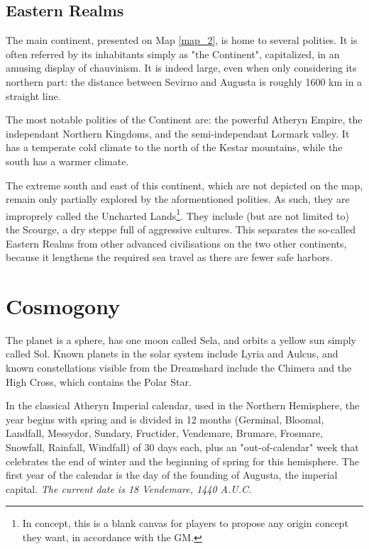 \subsection{Eastern Realms}

The main continent, presented on Map \ref{map_2}, is home to several polities. It is often referred by its inhabitants simply as "the Continent", capitalized, in an amusing display of chauvinism. It is indeed large, even when only considering its northern part: the distance between Sevirno and Augusta is roughly 1600 km in a straight line.

The most notable polities of the Continent are: the powerful Atheryn Empire, the independant Northern Kingdoms, and the semi-independant Lormark valley. It has a temperate cold climate to the north of the Kestar mountains, while the south has a warmer climate.

The extreme south and east of this continent, which are not depicted on the map, remain only partially explored by the aformentioned polities. As such, they are improprely called the Uncharted Lands\footnote{In concept, this is a blank canvas for players to propose any origin concept they want, in accordance with the GM.}. They include (but are not limited to) the Scourge, a dry steppe full of aggressive cultures. This separates the so-called Eastern Realms from other advanced civilisations on the two other continents, because it lengthens the required sea travel as there are fewer safe harbors.

\section{Cosmogony}

The planet is a sphere, has one moon called Sela, and orbits a yellow sun simply called Sol. Known planets in the solar system include Lyria and Aulcus, and known constellations visible from the Dreamshard include the Chimera and the High Cross, which contains the Polar Star.

In the classical Atheryn Imperial calendar, used in the Northern Hemisphere, the year begins with spring and is divided in 12 months (Germinal, Bloomal, Landfall, Messydor, Sundary, Fructider, Vendemare, Brumare, Frosmare, Snowfall, Rainfall, Windfall) of 30 days each, plus an "out-of-calendar" week that celebrates the end of winter and the beginning of spring for this hemisphere. The first year of the calendar is the day of the founding of Augusta, the imperial capital. \textit{The current date is 18 Vendemare, 1440 A.U.C.}


